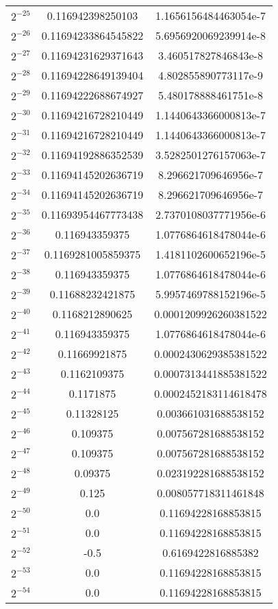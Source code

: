 \documentclass{article}
\begin{document}
\begin{longtable}[c]{|c|c|c|}
  $2^{-25}$ & 0.116942398250103 & 1.1656156484463054e-7 \\
  $2^{-26}$ & 0.11694233864545822 & 5.6956920069239914e-8 \\
  $2^{-27}$ & 0.11694231629371643 & 3.460517827846843e-8 \\
  $2^{-28}$ & 0.11694228649139404 & 4.802855890773117e-9 \\
  $2^{-29}$ & 0.11694222688674927 & 5.480178888461751e-8 \\
  $2^{-30}$ & 0.11694216728210449 & 1.1440643366000813e-7 \\
  $2^{-31}$ & 0.11694216728210449 & 1.1440643366000813e-7 \\
  $2^{-32}$ & 0.11694192886352539 & 3.5282501276157063e-7 \\
  $2^{-33}$ & 0.11694145202636719 & 8.296621709646956e-7 \\
  $2^{-34}$ & 0.11694145202636719 & 8.296621709646956e-7 \\
  $2^{-35}$ & 0.11693954467773438 & 2.7370108037771956e-6 \\
  $2^{-36}$ & 0.116943359375 & 1.0776864618478044e-6 \\
  $2^{-37}$ & 0.1169281005859375 & 1.4181102600652196e-5 \\
  $2^{-38}$ & 0.116943359375 & 1.0776864618478044e-6 \\
  $2^{-39}$ & 0.11688232421875 & 5.9957469788152196e-5 \\
  $2^{-40}$ & 0.1168212890625 & 0.0001209926260381522 \\
  $2^{-41}$ & 0.116943359375 & 1.0776864618478044e-6 \\
  $2^{-42}$ & 0.11669921875 & 0.0002430629385381522 \\
  $2^{-43}$ & 0.1162109375 & 0.0007313441885381522 \\
  $2^{-44}$ & 0.1171875 & 0.0002452183114618478 \\
  $2^{-45}$ & 0.11328125 & 0.003661031688538152 \\
  $2^{-46}$ & 0.109375 & 0.007567281688538152 \\
  $2^{-47}$ & 0.109375 & 0.007567281688538152 \\
  $2^{-48}$ & 0.09375 & 0.023192281688538152 \\
  $2^{-49}$ & 0.125 & 0.008057718311461848 \\
  $2^{-50}$ & 0.0 & 0.11694228168853815 \\
  $2^{-51}$ & 0.0 & 0.11694228168853815 \\
  $2^{-52}$ & -0.5 & 0.6169422816885382 \\
  $2^{-53}$ & 0.0 & 0.11694228168853815 \\
  $2^{-54}$ & 0.0 & 0.11694228168853815 \\
  \hline
\end{longtable}
\end{document}
